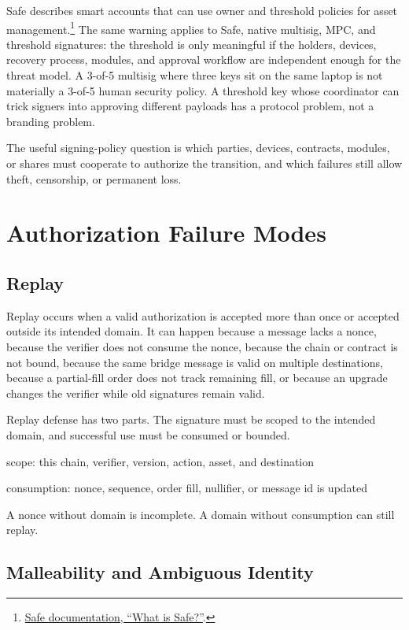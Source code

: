 Safe describes smart accounts that can use owner and threshold policies for asset management.\footnote{\href{https://docs.safe.global/home/what-is-safe}{Safe documentation, ``What is Safe?''}.} The same warning applies to Safe, native multisig, MPC, and threshold signatures: the threshold is only meaningful if the holders, devices, recovery process, modules, and approval workflow are independent enough for the threat model. A 3-of-5 multisig where three keys sit on the same laptop is not materially a 3-of-5 human security policy. A threshold key whose coordinator can trick signers into approving different payloads has a protocol problem, not a branding problem.

The useful signing-policy question is which parties, devices, contracts, modules, or shares must cooperate to authorize the transition, and which failures still allow theft, censorship, or permanent loss.

\section{Authorization Failure Modes}

\subsection{Replay}

Replay occurs when a valid authorization is accepted more than once or accepted outside its intended domain. It can happen because a message lacks a nonce, because the verifier does not consume the nonce, because the chain or contract is not bound, because the same bridge message is valid on multiple destinations, because a partial-fill order does not track remaining fill, or because an upgrade changes the verifier while old signatures remain valid.

Replay defense has two parts. The signature must be scoped to the intended domain, and successful use must be consumed or bounded.

\begin{codeblock}
scope:
    this chain, verifier, version, action, asset, and destination

consumption:
    nonce, sequence, order fill, nullifier, or message id is updated
\end{codeblock}

A nonce without domain is incomplete. A domain without consumption can still replay.

\subsection{Malleability and Ambiguous Identity}

